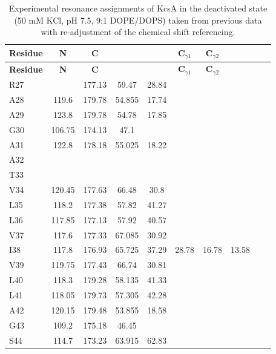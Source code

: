 \documentclass[%
 aip,
 amsmath,amssymb,
 preprint,%
]{revtex4-1}
\newcommand{\ca}{\ce{C_\alpha} }
\newcommand{\cb}{\ce{C_\beta} }
\newcommand{\cd}{\ce{C_\delta} }
\newcommand{\cep}{\ce{C_\epsilon} }
\newcommand{\cz}{\ce{C_\zeta} }
\begin{document}
\begingroup
\begin{center}
\begin{longtable}{l|c|c|c|c|c|c|c|c|c}
\caption{\scriptsize Experimental resonance assignments of KcsA in the deactivated state (50 mM KCl, pH 7.5, 9:1 DOPE/DOPS) taken from previous data\cite{Wylie2014} with re-adjustment of the chemical shift referencing.\label{SI_tb_deactivated_exp_CS}}\\ \hline \hline 
\textbf{Residue} & \textbf{N} & \textbf{C} & \textbf{\ca} & \textbf{\cb} & \textbf{C$_{\gamma1}$} & \textbf{C$_{\gamma2}$} & \textbf{\cd} & \textbf{\cep} & \textbf{\cz} \\ \hline
\endfirsthead 
\hline
\textbf{Residue} & \textbf{N} & \textbf{C} & \textbf{\ca} & \textbf{\cb} & \textbf{C$_{\gamma1}$} & \textbf{C$_{\gamma2}$} & \textbf{\cd} & \textbf{\cep} & \textbf{\cz} \\ \hline
\endhead
R27 & & 177.13 & 59.47 & 28.84 & & & & & \\\hline
A28 & 119.6 & 179.78 & 54.855 & 17.74 & & & & & \\\hline
A29 & 123.8 & 179.78 & 54.78 & 17.85 & & & & & \\\hline
G30 & 106.75 & 174.13 & 47.1 & & & & & & \\\hline
A31 & 122.8 & 178.18 & 55.025 & 18.22 & & & & & \\\hline
A32 & & & & & & & & & \\\hline
T33 & & & & & & & & & \\\hline
V34 & 120.45 & 177.63 & 66.48 & 30.8 & & & & & \\\hline
L35 & 118.2 & 177.38 & 57.82 & 41.27 & & & & & \\\hline
L36 & 117.85 & 177.13 & 57.92 & 40.57 & & & & & \\\hline
V37 & 117.6 & 177.33 & 67.085 & 30.92 & & & & & \\\hline
I38 & 117.8 & 176.93 & 65.725 & 37.29 & 28.78 & 16.78 & 13.58 & & \\\hline
V39 & 119.75 & 177.43 & 66.74 & 30.81 & & & & & \\\hline
L40 & 118.3 & 179.28 & 58.135 & 41.33 & & & & & \\\hline
L41 & 118.05 & 179.73 & 57.305 & 42.28 & & & & & \\\hline
A42 & 120.15 & 179.48 & 53.855 & 18.58 & & & & & \\\hline
G43 & 109.2 & 175.18 & 46.45 & & & & & & \\\hline
S44 & 114.7 & 173.23 & 63.915 & 62.83 & & & & & \\\hline

\end{longtable}
\end{center}
\end{document}
